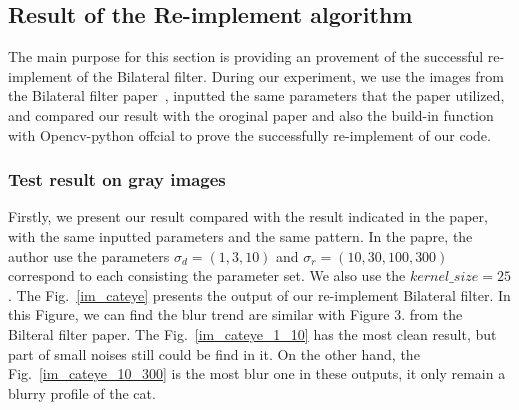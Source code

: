 \documentclass[12pt]{article}
\begin{document}
\subsection{Result of the Re-implement algorithm}
\label{section reimplement}
The main purpose for this section is providing an provement of the successful re-implement of the Bilateral filter.
During our experiment, we use the images from the Bilateral filter paper~\cite{paper_bf}, inputted the same parameters that the paper utilized, and compared our result with the oroginal paper and also the build-in function with Opencv-python offcial to prove the successfully re-implement of our code.

\subsubsection{Test result on gray images}
\label{subsection test gray}
Firstly, we present our result compared with the result indicated in the paper, with the same inputted parameters and the same pattern.
In the papre, the author use the parameters $\sigma_d = (1, 3, 10)$ and $\sigma_r = (10, 30, 100, 300)$ correspond to each consisting the parameter set.  
We also use the $kernel\_size = 25$.
The Fig.~\ref{im_cateye} presents the output of our re-implement Bilateral filter.
In this Figure, we can find the blur trend are similar with Figure 3. from the Bilteral filter paper.
The Fig.~\ref{im_cateye_1_10} has the most clean result, but part of small noises still could be find in it. 
On the other hand, the Fig.~\ref{im_cateye_10_300} is the most blur one in these outputs, it only remain a blurry profile of the cat. 
\end{document}
